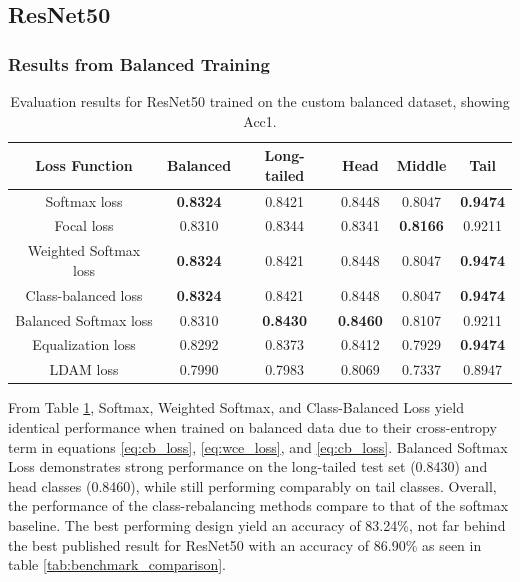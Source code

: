 \subsection{ResNet50}

\subsubsection{Results from Balanced Training}

\begin{table}[H]
    \centering
    \caption{Evaluation results for ResNet50 trained on the custom balanced dataset, showing Acc1.}
    \begin{tabular}{cccccc}
        \toprule
        Loss Function & Balanced & Long-tailed & Head & Middle & Tail \\ 
        \midrule
        Softmax loss   & \textbf{0.8324}  & 0.8421 & 0.8448 & 0.8047 & \textbf{0.9474} \\
        Focal loss   & 0.8310  & 0.8344 & 0.8341 & \textbf{0.8166} & 0.9211 \\
        Weighted Softmax loss   & \textbf{0.8324} & 0.8421 & 0.8448 & 0.8047 & \textbf{0.9474} \\
        Class-balanced loss   &  \textbf{0.8324} & 0.8421 & 0.8448 & 0.8047 & \textbf{0.9474} \\
        Balanced Softmax loss   & 0.8310 & \textbf{0.8430} & \textbf{0.8460} & 0.8107 & 0.9211 \\
        Equalization loss   & 0.8292 & 0.8373 & 0.8412 & 0.7929 & \textbf{0.9474} \\
        LDAM loss   & 0.7990 & 0.7983 & 0.8069 & 0.7337 & 0.8947 \\
        \bottomrule
    \end{tabular}
    \label{tab:resnet_bal_acc1_1}
\end{table}

From Table \ref{tab:resnet_bal_acc1_1}, Softmax, Weighted Softmax, and Class-Balanced Loss yield identical performance when trained on balanced data due to their cross-entropy term in equations \eqref{eq:cb_loss}, \eqref{eq:wce_loss}, and \eqref{eq:cb_loss}. Balanced Softmax Loss demonstrates strong performance on the long-tailed test set (0.8430) and head classes (0.8460), while still performing comparably on tail classes. Overall, the performance of the class-rebalancing methods compare to that of the softmax baseline. The best performing design yield an accuracy of 83.24\%, not far behind the best published result for ResNet50 with an accuracy of 86.90\% as seen in table \ref{tab:benchmark_comparison}.

